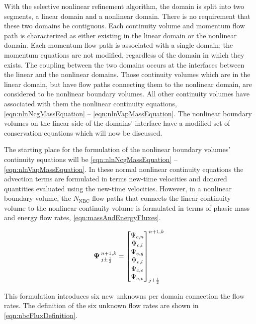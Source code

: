 With the selective nonlinear refinement algorithm, the domain is split into two segments, a linear domain and a nonlinear domain.
There is no requirement that these two domains be contiguous.
Each continuity volume and momentum flow path is characterized as either existing in the linear domain or the nonlinear domain.
Each momentum flow path is associated with a single domain; the momentum equations are not modified, regardless of the domain in which they exists.
The coupling between the two domains occurs at the interfaces between the linear and the nonlinear domains.
Those continuity volumes which are in the linear domain, but have flow paths connecting them to the nonlinear domain, are considered to be nonlinear boundary volumes.
All other continuity volumes have associated with them the nonlinear continuity equations, \eqref{eqn:nlnNcgMassEquation} -- \eqref{eqn:nlnVapMassEquation}.
The nonlinear boundary volumes on the linear side of the domains' interface have a modified set of conservation equations which will now be discussed.

The starting place for the formulation of the nonlinear boundary volumes' continuity equations will be \eqref{eqn:nlnNcgMassEquation} -- \eqref{eqn:nlnVapMassEquation}.
In these normal nonlinear continuity equations the advection terms are formulated in terms new-time velocities and donored quantities evaluated using the new-time velocities.
However, in a nonlinear boundary volume, the $N_{\text{NBC}}$ flow paths that connects the linear continuity volume to the nonlinear continuity volume is formulated in terms of phasic mass and energy flow rates, \eqref{eqn:massAndEnergyFluxes}.

\begin{equation}
\label{eqn:massAndEnergyFluxes}
\vec{\Psi}^{n+1, k}_{j \pm \onehalf} = \begin{bmatrix}
\Psi_{c, n} \\
\Psi_{c, l} \\
\Psi_{e, g} \\
\Psi_{e, l} \\
\Psi_{c, e} \\
\Psi_{c, v} \\
\end{bmatrix}^{n+1, k}_{j \pm \onehalf}
\end{equation}

This formulation introduces six new unknowns per domain connection the flow rates.
The definition of the six unknown flow rates are shown in \eqref{eqn:nbcFluxDefinition}.

